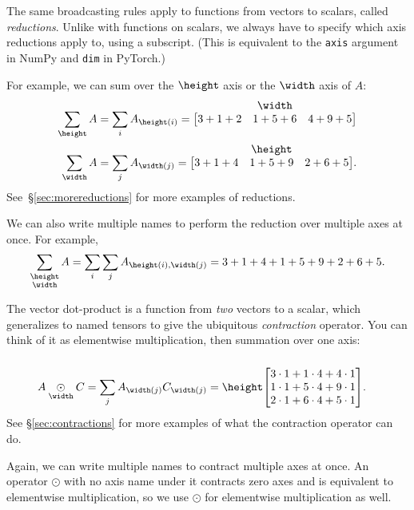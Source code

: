 \documentclass{article}
\makeatletter
\newcommand{\nmatrix}[3]{#1\begin{array}[b]{@{}c@{}}#2\\\begin{bmatrix}#3\end{bmatrix}\end{array}}
\makeatother
\begin{document}
The same broadcasting rules apply to functions from vectors to scalars, called \emph{reductions}. Unlike with functions on scalars, we always have to specify which axis reductions apply to, using a subscript. (This is equivalent to the \verb|axis| argument in NumPy and \verb|dim| in PyTorch.)

For example, we can sum over the $\height$ axis or the $\width$ axis of $A$:
\begin{align*}
\nsum{\height} A &= \sum_i A_{\height(i)} = \nmatrix{}{\width}{
  3+1+2 & 1+5+6 & 4+9+5
}
\\
\nsum{\width} A &= \sum_j A_{\width(j)} = \nmatrix{}{\height}{
  3+1+4 & 1+5+9 & 2+6+5
}.
\end{align*}
See~\S\ref{sec:morereductions} for more examples of reductions.

We can also write multiple names to perform the reduction over multiple axes at once. For example,
\begin{equation*}
  \nsum{\height \\ \width} A = \sum_i \sum_j A_{\height(i),\width(j)} = 3+1+4+1+5+9+2+6+5.
\end{equation*}

The vector dot-product is a function from \emph{two} vectors to a scalar, which generalizes to named tensors to give the ubiquitous \emph{contraction} operator. You can think of it as elementwise multiplication, then summation over one axis:
\begin{align*}
A \ndot{\width} C &= \sum_j A_{\width(j)} C_{\width(j)} = \nmatrix{\height}{}{
  3\cdot1 + 1\cdot4 + 4\cdot1 \\
  1\cdot1 + 5\cdot4 + 9\cdot1 \\
  2\cdot1 + 6\cdot4 + 5\cdot1
}.
\end{align*}
See \S\ref{sec:contractions} for more examples of what the contraction operator can do.

Again, we can write multiple names to contract multiple axes at once. An operator $\odot$ with no axis name under it contracts zero axes and is equivalent to elementwise multiplication, so we use $\odot$ for elementwise multiplication as well.
\end{document}
